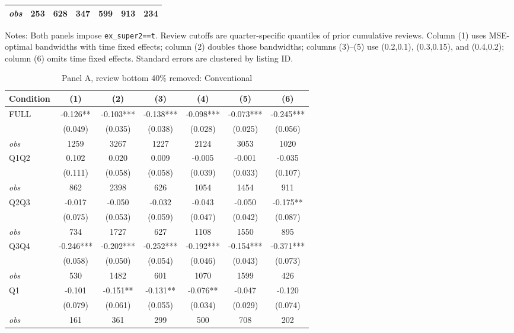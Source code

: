 \begin{table}[!htbp]
\begin{tabular}{lcccccc}
\textit{obs} & 253 & 628 & 347 & 599 & 913 & 234 \\
\bottomrule
\end{tabular}
\begin{minipage}{0.98\textwidth}\footnotesize
Notes: Both panels impose \texttt{ex\_super2==t}. Review cutoffs are quarter-specific quantiles of prior cumulative reviews. Column (1) uses MSE-optimal bandwidths with time fixed effects; column (2) doubles those bandwidths; columns (3)--(5) use (0.2,0.1), (0.3,0.15), and (0.4,0.2); column (6) omits time fixed effects. Standard errors are clustered by listing ID.
\end{minipage}
\end{table}

\begin{table}[!htbp]
\centering
\caption{Panel A, review bottom 40\% removed: Conventional}
\begin{tabular}{lcccccc}
\toprule
Condition & (1) & (2) & (3) & (4) & (5) & (6) \\
\midrule
FULL & -0.126** & -0.103*** & -0.138*** & -0.098*** & -0.073*** & -0.245*** \\
 & (0.049) & (0.035) & (0.038) & (0.028) & (0.025) & (0.056) \\
\textit{obs} & 1259 & 3267 & 1227 & 2124 & 3053 & 1020 \\
Q1Q2 & 0.102 & 0.020 & 0.009 & -0.005 & -0.001 & -0.035 \\
 & (0.111) & (0.058) & (0.058) & (0.039) & (0.033) & (0.107) \\
\textit{obs} & 862 & 2398 & 626 & 1054 & 1454 & 911 \\
Q2Q3 & -0.017 & -0.050 & -0.032 & -0.043 & -0.050 & -0.175** \\
 & (0.075) & (0.053) & (0.059) & (0.047) & (0.042) & (0.087) \\
\textit{obs} & 734 & 1727 & 627 & 1108 & 1550 & 895 \\
Q3Q4 & -0.246*** & -0.202*** & -0.252*** & -0.192*** & -0.154*** & -0.371*** \\
 & (0.058) & (0.050) & (0.054) & (0.046) & (0.043) & (0.073) \\
\textit{obs} & 530 & 1482 & 601 & 1070 & 1599 & 426 \\
Q1 & -0.101 & -0.151** & -0.131** & -0.076** & -0.047 & -0.120 \\
 & (0.079) & (0.061) & (0.055) & (0.034) & (0.029) & (0.074) \\
\textit{obs} & 161 & 361 & 299 & 500 & 708 & 202 \\

\end{tabular}
\end{table}
